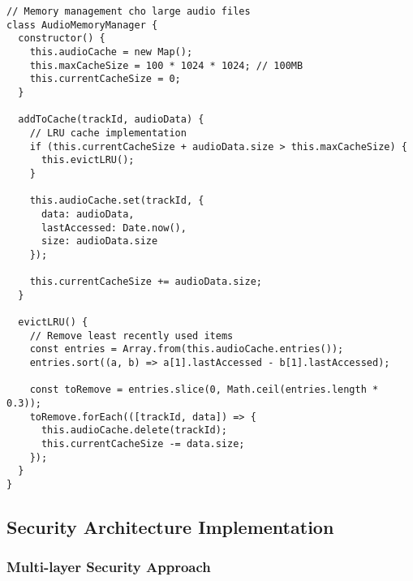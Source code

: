 \documentclass[12pt,a4paper]{article}
\begin{document}
\begin{lstlisting}[caption={Memory management cho large audio files}]
// Memory management cho large audio files
class AudioMemoryManager {
  constructor() {
    this.audioCache = new Map();
    this.maxCacheSize = 100 * 1024 * 1024; // 100MB
    this.currentCacheSize = 0;
  }
  
  addToCache(trackId, audioData) {
    // LRU cache implementation
    if (this.currentCacheSize + audioData.size > this.maxCacheSize) {
      this.evictLRU();
    }
    
    this.audioCache.set(trackId, {
      data: audioData,
      lastAccessed: Date.now(),
      size: audioData.size
    });
    
    this.currentCacheSize += audioData.size;
  }
  
  evictLRU() {
    // Remove least recently used items
    const entries = Array.from(this.audioCache.entries());
    entries.sort((a, b) => a[1].lastAccessed - b[1].lastAccessed);
    
    const toRemove = entries.slice(0, Math.ceil(entries.length * 0.3));
    toRemove.forEach(([trackId, data]) => {
      this.audioCache.delete(trackId);
      this.currentCacheSize -= data.size;
    });
  }
}
\end{lstlisting}

\subsection{Security Architecture Implementation}

\subsubsection{Multi-layer Security Approach}
\end{document}

